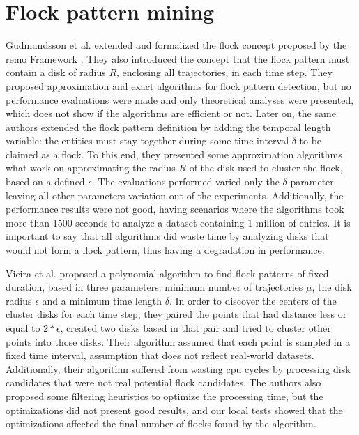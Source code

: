 \section{Flock pattern mining}
\label{sec:rel_flocks}
Gudmundsson et al. \citep{gudefficient} \citep{gudlongest} extended and formalized the flock concept proposed by the
\ac{remo} Framework \citep{remo}. They also introduced the concept that the flock pattern must contain a disk of radius
$R$, enclosing all trajectories, in each time step. They proposed approximation and exact algorithms for flock pattern
detection, but no performance evaluations were made and only theoretical analyses were presented, which does not show if
the algorithms are efficient or not. Later on, the same authors \citep{gudlongest} extended the flock pattern definition
by adding the temporal length variable: the entities must stay together during some time interval $\delta$ to be claimed
as a flock. To this end, they presented some approximation algorithms what work on approximating the radius $R$ of the
disk used to cluster the flock, based on a defined $\epsilon$. The evaluations performed \citep{gudlongest} varied only
the $\delta$ parameter leaving all other parameters variation out of the experiments. Additionally, the performance
results were not good, having scenarios where the algorithms took more than 1500 seconds to analyze a dataset containing
1 million of entries. It is important to say that all algorithms did waste time by analyzing disks that would not form a
flock pattern, thus having a degradation in performance.

Vieira et al. \citep{vieira} proposed a polynomial algorithm to find flock patterns of fixed duration, based in three
parameters: minimum number of trajectories $\mu$, the disk radius $\epsilon$ and a minimum time length $\delta$.  In
order to discover the centers of the cluster disks for each time step, they paired the points that had distance less or
equal to $2*\epsilon$, created two disks based in that pair and tried to cluster other points into those disks. Their
algorithm assumed that each point is sampled in a fixed time interval, assumption that does not reflect real-world
datasets. Additionally, their algorithm suffered from wasting \ac{cpu} cycles by processing disk candidates that were
not real potential flock candidates. The authors also proposed some filtering heuristics to optimize the processing
time, but the optimizations did not present good results, and our local tests showed that the optimizations affected the
final number of flocks found by the algorithm.


